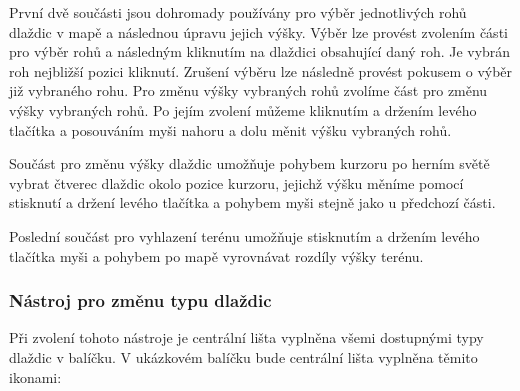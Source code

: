 \medskip
{}

\medskip
{}

\medskip
{}
\bigskip


První dvě součásti jsou dohromady používány pro výběr jednotlivých rohů dlaždic v mapě a následnou úpravu jejich výšky. Výběr lze provést zvolením části pro výběr rohů a následným kliknutím na dlaždici obsahující daný roh. Je vybrán roh nejbližší pozici kliknutí. Zrušení výběru lze následně provést pokusem o výběr již vybraného rohu. Pro změnu výšky vybraných rohů zvolíme část pro změnu výšky vybraných rohů. Po jejím zvolení můžeme kliknutím a držením levého tlačítka a posouváním myši nahoru a dolu měnit výšku vybraných rohů.

Součást pro změnu výšky dlaždic umožňuje pohybem kurzoru po herním světě vybrat čtverec dlaždic okolo pozice kurzoru, jejichž výšku měníme pomocí stisknutí a držení levého tlačítka a pohybem myši stejně jako u předchozí části.

Poslední součást pro vyhlazení terénu umožňuje stisknutím a držením levého tlačítka myši a pohybem po mapě vyrovnávat rozdíly výšky terénu.

\subsubsection{Nástroj pro změnu typu dlaždic}
Při zvolení tohoto nástroje je centrální lišta vyplněna všemi dostupnými typy dlaždic v balíčku. V ukázkovém balíčku bude centrální lišta vyplněna těmito ikonami:

